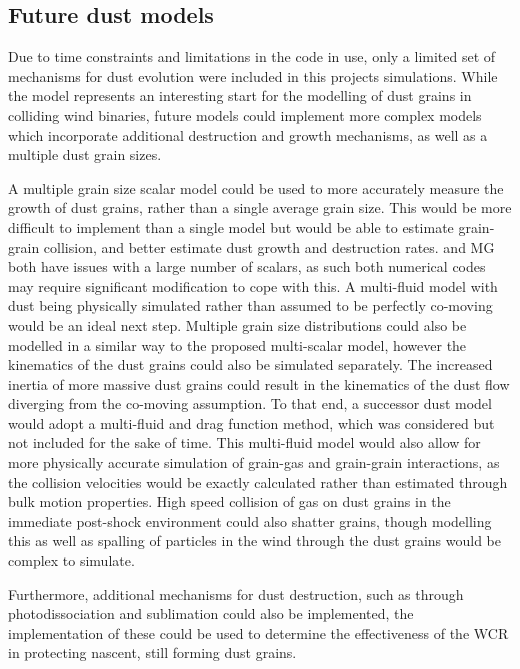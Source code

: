 \subsection{Future dust models}


Due to time constraints and limitations in the code in use, only a limited set of mechanisms for dust evolution were included in this projects simulations.
While the \bidmas{} model represents an interesting start for the modelling of dust grains in colliding wind binaries, future models could implement more complex models which incorporate additional destruction and growth mechanisms, as well as a multiple dust grain sizes.

A multiple grain size scalar model could be used to more accurately measure the growth of dust grains, rather than a single average grain size.
This would be more difficult to implement than a single model but would be able to estimate grain-grain collision, and better estimate dust growth and destruction rates.
\athena{} and MG both have issues with a large number of scalars, as such both numerical codes may require significant modification to cope with this.
A multi-fluid model with dust being physically simulated rather than assumed to be perfectly co-moving would be an ideal next step.
Multiple grain size distributions could also be modelled in a similar way to the proposed multi-scalar model, however the kinematics of the dust grains could also be simulated separately.
The increased inertia of more massive dust grains could result in the kinematics of the dust flow diverging from the co-moving assumption.
To that end, a successor dust model would adopt a multi-fluid and drag function method, which was considered but not included for the sake of time.
This multi-fluid model would also allow for more physically accurate simulation of grain-gas and grain-grain interactions, as the collision velocities would be exactly calculated rather than estimated through bulk motion properties.
High speed collision of gas on dust grains in the immediate post-shock environment could also shatter grains, though modelling this as well as spalling of particles in the wind through the dust grains would be complex to simulate. 

Furthermore, additional mechanisms for dust destruction, such as through photodissociation and sublimation could also be implemented, the implementation of these could be used to determine the effectiveness of the WCR in protecting nascent, still forming dust grains.

